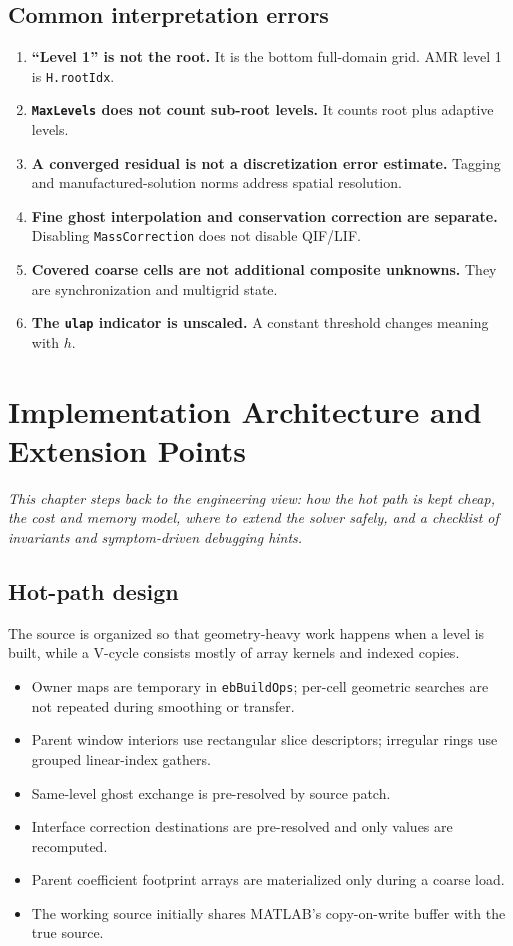 \documentclass[11pt,oneside,openany]{book}
\newcommand{\code}[1]{\textnormal{\texttt{#1}}}
\begin{document}
\section{Common interpretation errors}
\begin{enumerate}[label=\arabic*.]
\item \textbf{``Level 1'' is not the root.} It is the bottom full-domain grid. AMR level 1 is \code{H.rootIdx}.
\item \textbf{\code{MaxLevels} does not count sub-root levels.} It counts root plus adaptive levels.
\item \textbf{A converged residual is not a discretization error estimate.} Tagging and manufactured-solution norms address spatial resolution.
\item \textbf{Fine ghost interpolation and conservation correction are separate.} Disabling \code{MassCorrection} does not disable QIF/LIF.
\item \textbf{Covered coarse cells are not additional composite unknowns.} They are synchronization and multigrid state.
\item \textbf{The \code{ulap} indicator is unscaled.} A constant threshold changes meaning with $h$.
\end{enumerate}

\chapter{Implementation Architecture and Extension Points}
\label{chap:architecture}

\emph{This chapter steps back to the engineering view: how the hot path is kept cheap, the cost and memory model, where to extend the solver safely, and a checklist of invariants and symptom-driven debugging hints.}

\section{Hot-path design}
The source is organized so that geometry-heavy work happens when a level is built, while a V-cycle consists mostly of array kernels and indexed copies.

\begin{itemize}
\item Owner maps are temporary in \code{ebBuildOps}; per-cell geometric searches are not repeated during smoothing or transfer.
\item Parent window interiors use rectangular slice descriptors; irregular rings use grouped linear-index gathers.
\item Same-level ghost exchange is pre-resolved by source patch.
\item Interface correction destinations are pre-resolved and only values are recomputed.
\item Parent coefficient footprint arrays are materialized only during a coarse load.
\item The working source initially shares MATLAB's copy-on-write buffer with the true source.
\end{itemize}
\end{document}

